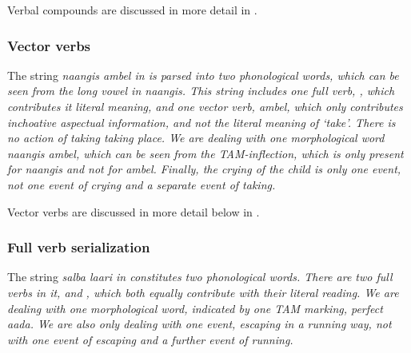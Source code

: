 
Verbal compounds are discussed in more detail in .

\subsubsection{Vector verbs}\label{sec:wc:mvc:Vectorverbs}
The string \em naangis ambel \em in  is parsed into two phonological words, which can be seen from the long vowel in \em naangis\em. This string includes one full verb, , which contributes it literal meaning, and one vector verb, \em ambel\em, which only contributes inchoative aspectual information, and not the literal meaning of `take'. There is no action of taking taking place. We are dealing with one morphological word   \em naangis ambel\em, which can be seen from the TAM-inflection, which is only present for \em naangis \em and not for \em ambel\em. Finally, the crying of the child is only one event, not one event of crying and a separate event of taking.


Vector verbs are discussed in more detail below in .
 
\subsubsection{Full verb serialization}\label{sec:wc:mvc:Fullverbserialization}
The string \em salba laari \em in  constitutes two phonological words. There are two full verbs in it,  and , which both equally contribute with their literal reading. We are dealing with one morphological word, indicated by one TAM marking, perfect \em aada\em. We are also only dealing with one event, escaping in a running way, not with one event  of escaping and a further event of running.

